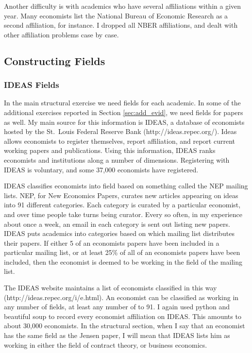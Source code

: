 \documentclass[]{article}
\begin{document}
Another difficulty is with academics who have several affiliations within
a given year. Many economists list the National Bureau of Economic
Research as a second affiliation, for instance. I dropped all NBER
affiliations, and dealt with other affiliation problems case by case.

\subsection{Constructing Fields}

\subsubsection{IDEAS Fields}

In the main structural exercise we need fields for each academic.
In some of the additional exercises reported in Section \ref{sec:add_evid}, we need
fields for papers as well. My main source for this information is IDEAS,
a database of economists hosted by the St.~Louis Federal Reserve Bank
(http://ideas.repec.org/). Ideas allows economists to register
themselves, report affiliation, and report current working papers and
publications. Using this information, IDEAS ranks economists and
institutions along a number of dimensions. Registering with IDEAS is
voluntary, and some 37,000 economists have registered.

IDEAS classifies economists into field based on something called the NEP
mailing lists. NEP, for New Economics Papers, curates new articles
appearing on ideas into 91 different categories. Each category is
curated by a particular economist, and over time people take turns being
curator. Every so often, in my experience about once a week, an email in
each category is sent out listing new papers. IDEAS puts academics into
categories based on which mailing list distributes their papers. If
either 5 of an economists papers have been included in a particular
mailing list, or at least 25\% of all of an economists papers have been
included, then the economist is deemed to be working in the field of the
mailing list.

The IDEAS website maintains a list of economists classified in this way
(http://ideas.repec.org/i/e.html). An economist can be classified as
working in any number of fields, at least any number of to 91. I again
used python and beautiful soup to record every economist affiliation on
IDEAS. This amounts to about 30,000 economists. In the structural
section, when I say that an economist has the same field as the Jensen
paper, I will mean that IDEAS lists him as working in either the field
of contract theory, or business economics.
\end{document}
